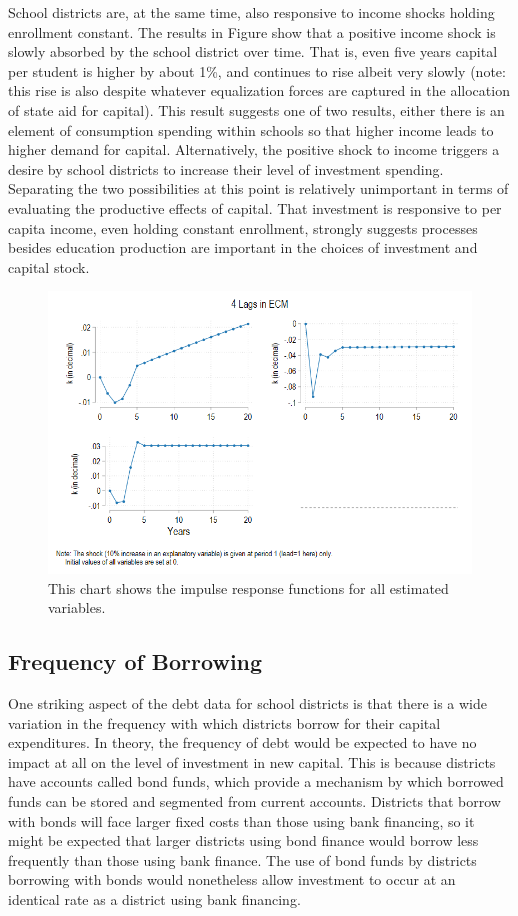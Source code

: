 School districts are, at the same time, also responsive to income shocks holding enrollment constant. The results in Figure show that a positive income shock is slowly absorbed by the school district over time. That is, even five years capital per student is higher by about 1\%, and continues to rise albeit very slowly (note: this rise is also despite whatever equalization forces are captured in the allocation of state aid for capital). This result suggests one of two results, either there is an element of consumption spending within schools so that higher income leads to higher demand for capital. Alternatively, the positive shock to income triggers a desire by school districts to increase their level of investment spending. Separating the two possibilities at this point is relatively unimportant in terms of evaluating the productive effects of capital. That investment is responsive to per capita income, even holding constant enrollment, strongly suggests processes besides education production are important in the choices of investment and capital stock.

\begin{figure}[H]
    \centering
    \includegraphics[width=.75\linewidth]{_fig/FImpulseResposne.png}
    \captionsetup{width=0.80\textwidth}
    \caption{
     This chart shows the impulse response functions for all estimated variables.}
\end{figure}
\clearpage

\subsection{Frequency of Borrowing}

One striking aspect of the debt data for school districts is that there is a wide variation in the frequency with which districts borrow for their capital expenditures. In theory, the frequency of debt would be expected to have no impact at all on the level of investment in new capital. This is because districts have accounts called bond funds, which provide a mechanism by which borrowed funds can be stored and segmented from current accounts. Districts that borrow with bonds will face larger fixed costs than those using bank financing, so it might be expected that larger districts using bond finance would borrow less frequently than those using bank finance. The use of bond funds by districts borrowing with bonds would nonetheless allow investment to occur at an identical rate as a district using bank financing. 

